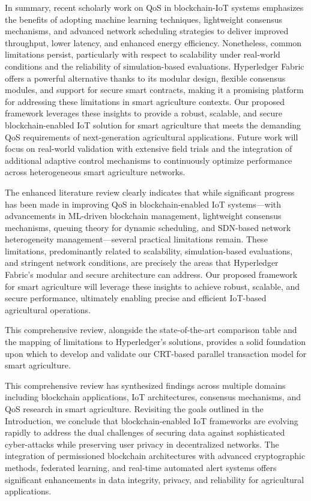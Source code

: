 \documentclass[12pt,onecolumn]{IEEEtran} %
\begin{document}
In summary, recent scholarly work on QoS in blockchain-IoT systems emphasizes the benefits of adopting machine learning techniques, lightweight consensus mechanisms, and advanced network scheduling strategies to deliver improved throughput, lower latency, and enhanced energy efficiency. Nonetheless, common limitations persist, particularly with respect to scalability under real-world conditions and the reliability of simulation-based evaluations. Hyperledger Fabric offers a powerful alternative thanks to its modular design, flexible consensus modules, and support for secure smart contracts, making it a promising platform for addressing these limitations in smart agriculture contexts. Our proposed framework leverages these insights to provide a robust, scalable, and secure blockchain-enabled IoT solution for smart agriculture that meets the demanding QoS requirements of next-generation agricultural applications. Future work will focus on real-world validation with extensive field trials and the integration of additional adaptive control mechanisms to continuously optimize performance across heterogeneous smart agriculture networks.

The enhanced literature review clearly indicates that while significant progress has been made in improving QoS in blockchain-enabled IoT systems—with advancements in ML-driven blockchain management, lightweight consensus mechanisms, queuing theory for dynamic scheduling, and SDN-based network heterogeneity management—several practical limitations remain. These limitations, predominantly related to scalability, simulation-based evaluations, and stringent network conditions, are precisely the areas that Hyperledger Fabric's modular and secure architecture can address. Our proposed framework for smart agriculture will leverage these insights to achieve robust, scalable, and secure performance, ultimately enabling precise and efficient IoT-based agricultural operations.

This comprehensive review, alongside the state-of-the-art comparison table and the mapping of limitations to Hyperledger's solutions, provides a solid foundation upon which to develop and validate our CRT-based parallel transaction model for smart agriculture.

This comprehensive review has synthesized findings across multiple domains including blockchain applications, IoT architectures, consensus mechanisms, and QoS research in smart agriculture. Revisiting the goals outlined in the Introduction, we conclude that blockchain-enabled IoT frameworks are evolving rapidly to address the dual challenges of securing data against sophisticated cyber-attacks while preserving user privacy in decentralized networks. The integration of permissioned blockchain architectures with advanced cryptographic methods, federated learning, and real-time automated alert systems offers significant enhancements in data integrity, privacy, and reliability for agricultural applications.
\end{document}
